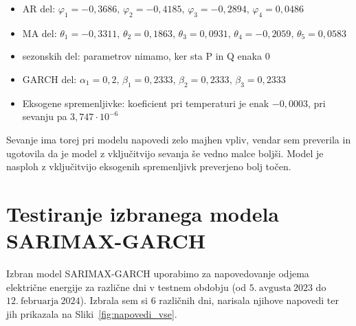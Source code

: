 \documentclass[a4paper, 11pt]{article}
\begin{document}
\begin{itemize}
    \item  AR del: $\varphi_1 = -0{,}3686,\, \varphi_2 = -0{,}4185,\, \varphi_3 = -0{,2894},\, \varphi_4 = 0{,0486}$
    \item  MA del: $\theta_1 = - 0{,}3311,\, \theta_2 = 0{,}1863,\, \theta_3 = 0{,}0931,\, \theta_4 = -0{,}2059,\, \theta_5 = 0{,}0583$
    \item  sezonskih del: parametrov nimamo, ker sta P in Q enaka $0$
    \item  GARCH del: $\alpha_1 = 0{,}2,\, \beta_1 = 0{,}2333,\, \beta_2 = 0{,}2333,\, \beta_3 = 0{,}2333$
    \item  Eksogene spremenljivke: koeficient pri temperaturi je enak $-0{,}0003$, pri sevanju pa $3{,}747 \cdot 10^{-6}$
\end{itemize}

\noindent Sevanje ima torej pri modelu napovedi zelo majhen vpliv, vendar sem preverila in ugotovila da je model z vključitvijo sevanja
še vedno malce boljši. Model je nasploh z vključitvijo eksogenih spremenljivk preverjeno bolj točen. 



\section{Testiranje izbranega modela SARIMAX-GARCH}

Izbran model SARIMAX-GARCH uporabimo za napovedovanje odjema električne energije za različne dni v testnem obdobju
(od $5.~\text{avgusta}~2023$ do $12.~\text{februarja}~2024$). Izbrala sem si $6$ različnih dni, narisala njihove napovedi ter
jih prikazala na Sliki~\ref{fig:napovedi_vse}.
\end{document}
